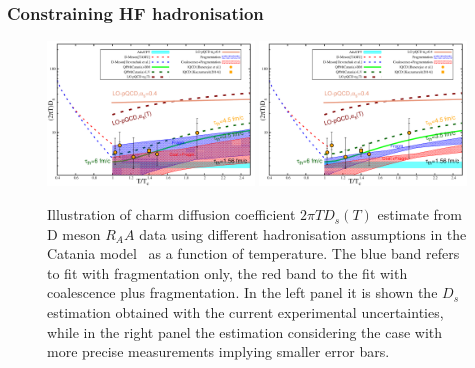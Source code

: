 


\subsubsection{Constraining HF hadronisation}
\label{sec:HFhadro3}


\begin{figure}[!hb]
\begin{center}
\includegraphics[width=0.49\textwidth]{hf/figures/Ds_Tc_large.pdf}
\includegraphics[width=0.49\textwidth]{hf/figures/Ds_Tc_small.pdf}
\end{center}
\caption{Illustration of charm diffusion coefficient $2 \pi T D_s(T)$ 
estimate from D meson $R_AA$ data using different hadronisation assumptions in the Catania model~\cite{Das:2015ana,Das:2013kea} as a function of temperature. The blue band refers to fit with fragmentation only, the red band to the fit with coalescence plus fragmentation. In the left panel it is shown the $D_s$ estimation obtained with the current experimental uncertainties, while in the right panel the estimation considering the case with more precise measurements implying smaller error bars. }
\label{Fig:CHI2}
\end{figure}


